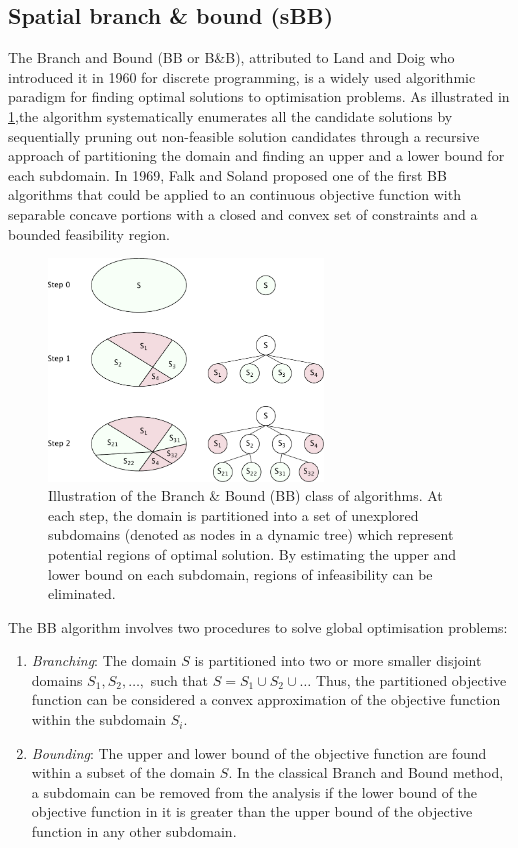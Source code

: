 \subsection{Spatial branch \& bound (sBB)}
    The Branch and Bound (BB or B\&B), attributed to Land and Doig \cite{Land:1960aa} who introduced it in 1960 for discrete programming, is a widely used algorithmic paradigm for finding optimal solutions to optimisation problems. As illustrated in \ref{fig:BB},the algorithm systematically enumerates all the candidate solutions by sequentially pruning out non-feasible solution candidates through a recursive approach of partitioning the domain and finding an upper and a lower bound for each subdomain. In 1969, Falk and Soland \cite{Falk69} proposed one of the first BB algorithms that could be applied to an continuous objective function with separable concave portions with a closed and convex set of constraints and a bounded feasibility region.
		\begin{figure}[htbp]
		\centering
		\includegraphics[width=0.65\textwidth]{figures/chapter-6/BB.pdf}
		\caption[Illustration of Branch \& Bound (BB) class of algorithms.]{Illustration of the Branch \& Bound (BB) class of algorithms. At each step, the domain is partitioned into a set of unexplored subdomains (denoted as nodes in a dynamic tree) which represent potential regions of optimal solution. By estimating the upper and lower bound on each subdomain, regions of infeasibility can be eliminated.}
		\label{fig:BB}
	\end{figure}
The BB algorithm involves two procedures to solve global optimisation problems:
	\begin{enumerate}
		\item \emph{Branching}: The domain $S$ is partitioned into two or more smaller disjoint domains $S_1,S_2,\dots,$ such that $S = S_1 \cup S_2 \cup \dots$ Thus, the partitioned objective function can be considered a convex approximation of the objective function within the subdomain $S_i$.
		\item \emph{Bounding}: The upper and lower bound of the objective function are found within a subset of the domain $S$. In the classical Branch and Bound method, a subdomain can be removed from the analysis if the lower bound of the objective function in it is greater than the upper bound of the objective function in any other subdomain.
	\end{enumerate}
